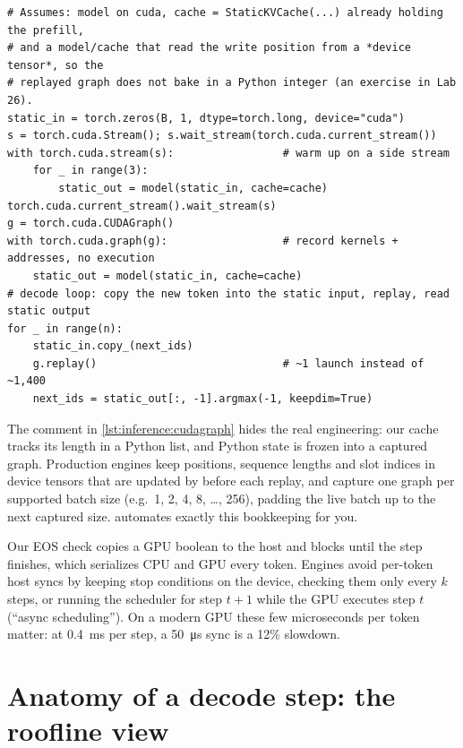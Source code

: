 \begin{lstlisting}[caption={Capturing one static-cache decode step in a CUDA graph (GPU only).},label={lst:inference:cudagraph}]
# Assumes: model on cuda, cache = StaticKVCache(...) already holding the prefill,
# and a model/cache that read the write position from a *device tensor*, so the
# replayed graph does not bake in a Python integer (an exercise in Lab 26).
static_in = torch.zeros(B, 1, dtype=torch.long, device="cuda")
s = torch.cuda.Stream(); s.wait_stream(torch.cuda.current_stream())
with torch.cuda.stream(s):                 # warm up on a side stream
    for _ in range(3):
        static_out = model(static_in, cache=cache)
torch.cuda.current_stream().wait_stream(s)
g = torch.cuda.CUDAGraph()
with torch.cuda.graph(g):                  # record kernels + addresses, no execution
    static_out = model(static_in, cache=cache)
# decode loop: copy the new token into the static input, replay, read static output
for _ in range(n):
    static_in.copy_(next_ids)
    g.replay()                             # ~1 launch instead of ~1,400
    next_ids = static_out[:, -1].argmax(-1, keepdim=True)
\end{lstlisting}

The comment in \cref{lst:inference:cudagraph} hides the real engineering: our cache tracks its
length in a Python list, and Python state is frozen into a captured graph. Production engines keep
positions, sequence lengths and slot indices in device tensors that are updated by 
before each replay, and capture one graph per supported batch size (e.g.\ 1, 2, 4, 8, \ldots, 256),
padding the live batch up to the next captured size. 
automates exactly this bookkeeping for you.

\begin{systemslens}
Our EOS check  copies a GPU boolean to the host and blocks
until the step finishes, which serializes CPU and GPU every token. Engines avoid per-token host
syncs by keeping stop conditions on the device, checking them only every $k$ steps, or running
the scheduler for step $t+1$ while the GPU executes step $t$ (``async scheduling''). On a modern GPU
these few microseconds per token matter: at \SI{0.4}{ms} per step, a \SI{50}{\micro s} sync is a
12\% slowdown.
\end{systemslens}

\section{Anatomy of a decode step: the roofline view}\label{sec:inference:roofline}

